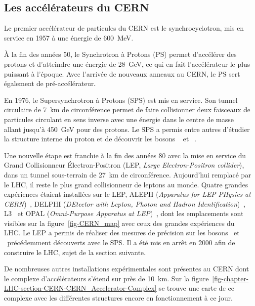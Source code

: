 \subsection{Les accélérateurs du CERN}
Le premier accélérateur de particules du CERN est le synchrocyclotron, mis en service en 1957 à une énergie de \SI{600}{\MeV}.
\par À la fin des années 50, le Synchrotron à Protons (PS) permet d'accélérer des protons et d'atteindre une énergie de \SI{28}{\GeV}, ce qui en fait l'accélérateur le plus puissant à l'époque.
Avec l'arrivée de nouveaux anneaux au CERN, le PS sert également de pré-accélérateur.
\par En 1976, le Supersynchrotron à Protons (SPS) est mis en service.
Son tunnel circulaire de \SI{7}{\kilo\meter} de circonférence permet de faire collisionner deux faisceaux de particules circulant en sens inverse avec une énergie dans le centre de masse allant jusqu'à \SI{450}{\GeV} pour des protons.
Le SPS a permis entre autres d'étudier la structure interne du proton et de découvrir les bosons
\Wboson~\cite{Wboson_discovery1,Wboson_discovery2,Wboson_discovery3}
et
\Zboson~\cite{Zboson_discovery1,Zboson_discovery2}.
\par Une nouvelle étape est franchie à la fin des années 80 avec la mise en service du Grand Collisionneur Électron-Positron (LEP, \emph{Large Electron-Positron collider}), dans un tunnel sous-terrain de \SI{27}{\kilo\meter} de circonférence.
Aujourd’hui remplacé par le LHC, il reste le plus grand collisionneur de leptons au monde.
Quatre grandes expériences étaient installées sur le LEP,
ALEPH (\emph{Apparatus for LEP PHysics at CERN})~\cite{aleph_paper},
DELPHI (\emph{DEtector with Lepton, Photon and Hadron Identification})~\cite{delphi_paper},
L3~\cite{l3_paper} et
OPAL (\emph{Omni-Purpose Apparatus at LEP})~\cite{opal_paper},
dont les emplacements sont visibles sur la figure~\ref{fig-CERN_map} avec ceux des grandes expériences du LHC.
Le LEP a permis de réaliser des mesures de précision sur les bosons \Wboson\ et \Zboson\ précédemment découverts avec le SPS.
Il a été mis en arrêt en 2000 afin de construire le LHC, sujet de la section suivante.
\par De nombreuses autres installations expérimentales sont présentes au CERN dont le complexe d'accélérateurs s'étend sur près de \SI{10}{\kilo\meter}.
Sur la figure~\ref{fig-chapter-LHC-section-CERN-CERN_Accelerator-Complex} se trouve une carte de ce complexe avec les différentes structures encore en fonctionnement à ce jour.
